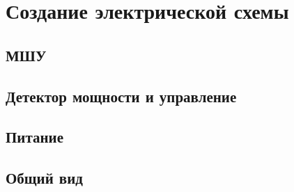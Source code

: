 \chapter{Создание электрической схемы}

\section{МШУ}


\section{Детектор мощности и управление}


\section{Питание}


\section{Общий вид}
